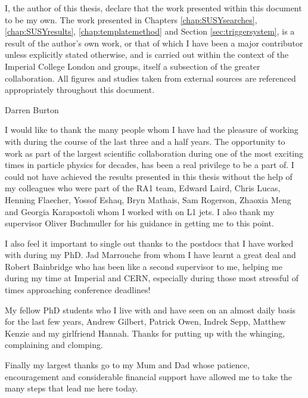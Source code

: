 \begin{declaration}
  I, the author of this thesis, declare that the work presented within this document to be my own.  The work presented in Chapters \ref{chap:SUSYsearches}, \ref{chap:SUSYresults},  \ref{chap:templatemethod} and Section \ref{sec:triggersystem}, is a result of the author's own work, or that of which I have been a major contributor unless explicitly stated otherwise, and is carried out within the context of the Imperial College London and \CERN \SUSY groups, itself a subsection of the greater \CMS collaboration.  All figures and studies taken from external sources are referenced appropriately throughout this document.
  
  \vspace*{1cm}
  \begin{flushright}
    Darren Burton
  \end{flushright}
\end{declaration}


\begin{acknowledgements}
  I would like to thank the many people whom I have had the pleasure of working with during the course of the last three and a half years. The opportunity to work as part of the largest scientific collaboration during one of the most exciting times in particle physics for decades, has been a real privilege to be a part of. I could not have achieved the results presented in this thesis without the help of my colleagues who were part of the RA1 team, Edward Laird, Chris Lucas, Henning Flaecher, Yossof Eshaq, Bryn Mathais, Sam Rogerson, Zhaoxia Meng and Georgia Karapostoli whom I worked with on L1 jets. I also thank my supervisor Oliver Buchmuller for his guidance in getting me to this point. 
 
I also feel it important to single out thanks to the postdocs that I have worked with during my PhD. Jad Marrouche from whom I have learnt a great deal and Robert Bainbridge who has been like a second supervisor to me, helping me during my time at Imperial and CERN, especially during those most stressful of times approaching conference deadlines! 

My fellow PhD students who I live with and have seen on an almost daily basis for the last few years, Andrew Gilbert, Patrick Owen, Indrek Sepp, Matthew Kenzie and my girlfriend Hannah. Thanks for putting up with the whinging, complaining and clomping. 

Finally my largest thanks go to my Mum and Dad whose patience, encouragement and considerable financial support have allowed me to take the many steps that lead me here today. 
 
\end{acknowledgements}

\tableofcontents
\listoffigures
\listoftables
